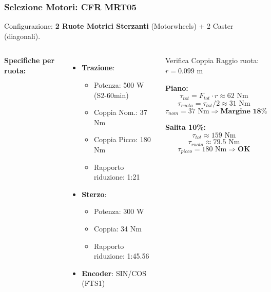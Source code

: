 \begin{frame}
    \frametitle{Selezione Motori: CFR MRT05}
    Configurazione: \textbf{2 Ruote Motrici Sterzanti} (Motorwheels) + 2 Caster (diagonali).

    \begin{columns}
        \textbf{Specifiche per ruota:}
        \begin{itemize}
            \item \textbf{Trazione}:
                  \begin{itemize}
                      \item Potenza: 500 W (S2-60min)
                      \item Coppia Nom.: 37 Nm
                      \item Coppia Picco: 180 Nm
                      \item Rapporto riduzione: 1:21
                  \end{itemize}
            \item \textbf{Sterzo}:
                  \begin{itemize}
                      \item Potenza: 300 W
                      \item Coppia: 34 Nm
                      \item Rapporto riduzione: 1:45.56
                  \end{itemize}
            \item \textbf{Encoder}: SIN/COS (FTS1)
        \end{itemize}

        {\small
            \begin{block}{Verifica Coppia}
                Raggio ruota: $r = 0.099$ m

                \textbf{Piano:}
                $$\tau_{tot} = F_{tot} \cdot r \approx 62 \text{ Nm}$$
                $$\tau_{ruota} = \tau_{tot}/2 \approx 31 \text{ Nm}$$
                $$\tau_{nom} = 37 \text{ Nm} \Rightarrow \textbf{Margine 18\%}$$

                \textbf{Salita 10\%:}
                $$\tau_{tot} \approx 159 \text{ Nm}$$
                $$\tau_{ruota} \approx 79.5 \text{ Nm}$$
                $$\tau_{picco} = 180 \text{ Nm} \Rightarrow \textbf{OK}$$
            \end{block}
        }
    \end{columns}
\end{frame}
